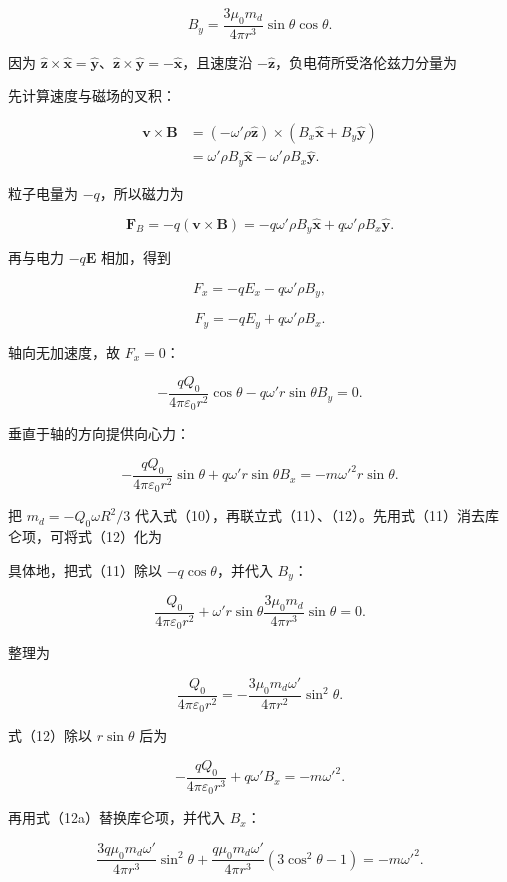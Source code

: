 \documentclass[12pt,a4paper,UTF8]{ctexart}
\begin{document}
\[B_y=\frac{3\mu_0m_d}{4\pi r^3}\sin\theta\cos\theta. \tag{10}\]

因为
\(\hat{\boldsymbol z}\times\hat{\boldsymbol x}=\hat{\boldsymbol y}\)、\(\hat{\boldsymbol z}\times\hat{\boldsymbol y}=-\hat{\boldsymbol x}\)，且速度沿
\(-\hat{\boldsymbol z}\)，负电荷所受洛伦兹力分量为

先计算速度与磁场的叉积：

\[\begin{aligned}
\boldsymbol v\times\boldsymbol B
&=(-\omega'\rho\hat{\boldsymbol z})
\times(B_x\hat{\boldsymbol x}+B_y\hat{\boldsymbol y})\\
&=\omega'\rho B_y\hat{\boldsymbol x}
-\omega'\rho B_x\hat{\boldsymbol y}.
\end{aligned}\]

粒子电量为 \(-q\)，所以磁力为

\[\boldsymbol F_B=-q(\boldsymbol v\times\boldsymbol B)
=-q\omega'\rho B_y\hat{\boldsymbol x}
+q\omega'\rho B_x\hat{\boldsymbol y}.\]

再与电力 \(-q\boldsymbol E\) 相加，得到

\[F_x=-qE_x-q\omega'\rho B_y,\]

\[F_y=-qE_y+q\omega'\rho B_x.\]

轴向无加速度，故 \(F_x=0\)：

\[-\frac{qQ_0}{4\pi\varepsilon_0r^2}\cos\theta
-q\omega'r\sin\theta B_y=0. \tag{11}\]

垂直于轴的方向提供向心力：

\[-\frac{qQ_0}{4\pi\varepsilon_0r^2}\sin\theta
+q\omega'r\sin\theta B_x
=-m\omega'^2r\sin\theta. \tag{12}\]

把 \(m_d=-Q_0\omega R^2/3\)
代入式（10），再联立式（11）、（12）。先用式（11）消去库仑项，可将式（12）化为

具体地，把式（11）除以 \(-q\cos\theta\)，并代入 \(B_y\)：

\[\frac{Q_0}{4\pi\varepsilon_0r^2}
+\omega'r\sin\theta
\frac{3\mu_0m_d}{4\pi r^3}\sin\theta=0.\]

整理为

\[\frac{Q_0}{4\pi\varepsilon_0r^2}
=-\frac{3\mu_0m_d\omega'}{4\pi r^2}\sin^2\theta. \tag{12a}\]

式（12）除以 \(r\sin\theta\) 后为

\[-\frac{qQ_0}{4\pi\varepsilon_0r^3}
+q\omega'B_x=-m\omega'^2.\]

再用式（12a）替换库仑项，并代入 \(B_x\)：

\[\frac{3q\mu_0m_d\omega'}{4\pi r^3}\sin^2\theta
+\frac{q\mu_0m_d\omega'}{4\pi r^3}(3\cos^2\theta-1)
=-m\omega'^2.\]
\end{document}
